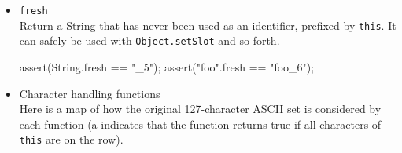 \begin{itemize}
\item \lstinline|fresh|\\
  Return a String that has never been used as an identifier, prefixed
  by \lstinline|this|.  It can safely be used with
  \lstinline|Object.setSlot| and so forth.
\begin{urbiscript}[firstnumber=last]
assert(String.fresh == "_5");
assert("foo".fresh == "foo_6");
\end{urbiscript}

\item Character handling functions\\
  Here is a map of how the original 127-character ASCII set is
  considered by each function (a \textbullet{} indicates that the function
  returns true if all characters of \lstinline|this| are on the
  row).


\end{itemize}
